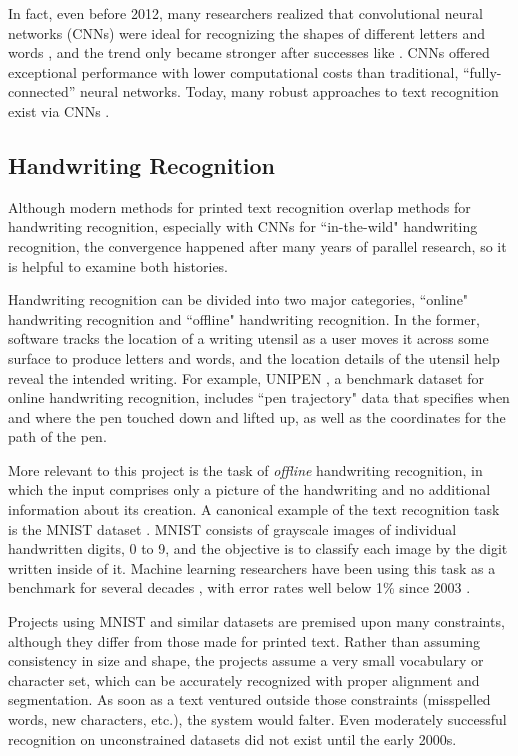 \documentclass[final]{ukthesis}
\begin{document}
In fact, even before 2012, many researchers realized that convolutional neural networks (CNNs) were ideal for recognizing the shapes of different letters and words \cite{saidane2007automatic,delakis2008text}, and the trend only became stronger after successes like \cite{wang2012end}. CNNs offered exceptional performance with lower computational costs than traditional, ``fully-connected'' neural networks. Today, many robust approaches to text recognition exist via CNNs \cite{wang2012end,yin2014robust,jaderberg2016reading}.


\subsection{Handwriting Recognition}
Although modern methods for printed text recognition overlap methods for handwriting recognition, especially with CNNs for ``in-the-wild" handwriting recognition, the convergence happened after many years of parallel research, so it is helpful to examine both histories.

Handwriting recognition can be divided into two major categories, ``online" handwriting recognition and ``offline" handwriting recognition. In the former, software tracks the location of a writing utensil as a user moves it across some surface to produce letters and words, and the location details of the utensil help reveal the intended writing. For example, UNIPEN \cite{guyon1994unipen}, a benchmark dataset for online handwriting recognition, includes ``pen trajectory" data that specifies when and where the pen touched down and lifted up, as well as the coordinates for the path of the pen.

More relevant to this project is the task of {\em offline} handwriting recognition, in which the input comprises only a picture of the handwriting and no additional information about its creation. A canonical example of the text recognition task is the MNIST dataset \cite{lecun1998mnist}. MNIST consists of grayscale images of individual handwritten digits, 0 to 9, and the objective is to classify each image by the digit written inside of it. Machine learning researchers have been using this task as a benchmark for several decades \cite{bottou1994comparison}, with error rates well below 1\% since 2003 \cite{kussul2004improved}.

Projects using MNIST and similar datasets are premised upon many constraints, although they differ from those made for printed text. Rather than assuming consistency in size and shape, the projects assume a very small vocabulary or character set, which can be accurately recognized with proper alignment and segmentation. As soon as a text ventured outside those constraints (misspelled words, new characters, etc.), the system would falter. Even moderately successful recognition on unconstrained datasets did not exist until the early 2000s.
\end{document}
